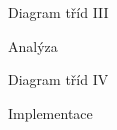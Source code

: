 

\begin{frame}{Diagram tříd III}

Analýza

\begin{figure}
\end{figure}

\end{frame}



\begin{frame}{Diagram tříd IV}

Implementace

\begin{figure}
\end{figure}

\end{frame}
